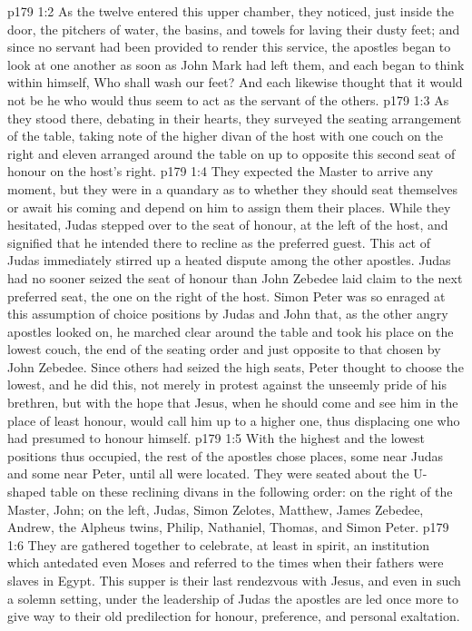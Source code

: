\vs p179 1:2 As the twelve entered this upper chamber, they noticed, just inside the door, the pitchers of water, the basins, and towels for laving their dusty feet; and since no servant had been provided to render this service, the apostles began to look at one another as soon as John Mark had left them, and each began to think within himself, Who shall wash our feet? And each likewise thought that it would not be he who would thus seem to act as the servant of the others.
\vs p179 1:3 As they stood there, debating in their hearts, they surveyed the seating arrangement of the table, taking note of the higher divan of the host with one couch on the right and eleven arranged around the table on up to opposite this second seat of honour on the host’s right.
\vs p179 1:4 They expected the Master to arrive any moment, but they were in a quandary as to whether they should seat themselves or await his coming and depend on him to assign them their places. While they hesitated, Judas stepped over to the seat of honour, at the left of the host, and signified that he intended there to recline as the preferred guest. This act of Judas immediately stirred up a heated dispute among the other apostles. Judas had no sooner seized the seat of honour than John Zebedee laid claim to the next preferred seat, the one on the right of the host. Simon Peter was so enraged at this assumption of choice positions by Judas and John that, as the other angry apostles looked on, he marched clear around the table and took his place on the lowest couch, the end of the seating order and just opposite to that chosen by John Zebedee. Since others had seized the high seats, Peter thought to choose the lowest, and he did this, not merely in protest against the unseemly pride of his brethren, but with the hope that Jesus, when he should come and see him in the place of least honour, would call him up to a higher one, thus displacing one who had presumed to honour himself.
\vs p179 1:5 With the highest and the lowest positions thus occupied, the rest of the apostles chose places, some near Judas and some near Peter, until all were located. They were seated about the U\hyp{}shaped table on these reclining divans in the following order: on the right of the Master, John; on the left, Judas, Simon Zelotes, Matthew, James Zebedee, Andrew, the Alpheus twins, Philip, Nathaniel, Thomas, and Simon Peter.
\vs p179 1:6 \pc They are gathered together to celebrate, at least in spirit, an institution which antedated even Moses and referred to the times when their fathers were slaves in Egypt. This supper is their last rendezvous with Jesus, and even in such a solemn setting, under the leadership of Judas the apostles are led once more to give way to their old predilection for honour, preference, and personal exaltation.
